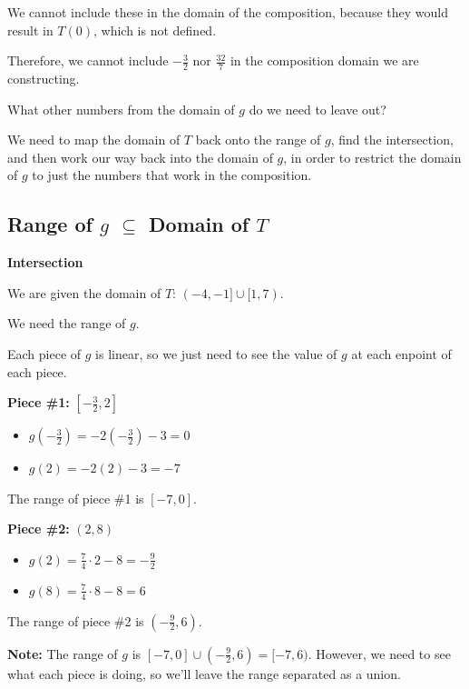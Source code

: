 \documentclass{ximera}
\begin{document}
We cannot include these in the domain of the composition, because they would result in $T(0)$, which is not defined.

Therefore, we cannot include $-\frac{3}{2}$ nor $\frac{32}{7}$ in the composition domain we are constructing.  

What other numbers from the domain of $g$ do we need to leave out?








We need to map the domain of $T$ back onto the range of $g$, find the intersection, and then work our way back into the domain of $g$, in order to restrict the domain of $g$ to just the numbers that work in the composition.





\subsection*{Range of $g$ $\subseteq$ Domain of $T$}


\textbf{\textcolor{red!75!green}{Intersection}} 


We are given the domain of $T$:  $(-4,-1] \cup [1, 7)$.

We need the range of $g$.


Each piece of $g$ is linear, so we just need to see the value of $g$ at each enpoint of each piece.

\textbf{Piece \#1:} $\left[ -\frac{3}{2}, 2 \right]$
\begin{itemize}
\item $g\left( -\frac{3}{2} \right) = -2 \left( -\frac{3}{2} \right) - 3 = 0 $
\item $g(2) = -2 (2)-3 = -7$
\end{itemize}
The range of piece \#1 is $[-7, 0]$.



\textbf{Piece \#2:} $(2, 8)$
\begin{itemize}
\item $g(2) = \frac{7}{4} \cdot 2 - 8 = -\frac{9}{2} $
\item $g(8) = \frac{7}{4} \cdot 8 - 8 = 6 $
\end{itemize}
The range of piece \#2 is $\left( -\frac{9}{2}, 6 \right)$.


\textbf{Note:} The range of $g$ is $[-7, 0] \cup \left( -\frac{9}{2}, 6 \right) = [-7, 6)$.  However, we need to see what each piece is doing, so we'll leave the range separated as a union. 
\end{document}
